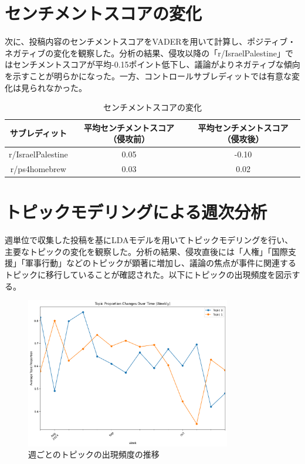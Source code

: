 \documentclass[11pt, a4j]{jreport}
\begin{document}
    \section{センチメントスコアの変化}
    次に、投稿内容のセンチメントスコアをVADERを用いて計算し、ポジティブ・ネガティブの変化を観察した。分析の結果、侵攻以降の「r/IsraelPalestine」ではセンチメントスコアが平均-0.15ポイント低下し、議論がよりネガティブな傾向を示すことが明らかになった。一方、コントロールサブレディットでは有意な変化は見られなかった。

    \begin{table}[H]
        \centering
        \begin{tabular}{|c|c|c|}
            \hline
            サブレディット & 平均センチメントスコア（侵攻前） & 平均センチメントスコア（侵攻後） \\
            \hline
            r/IsraelPalestine & 0.05 & -0.10 \\
            r/ps4homebrew & 0.03 & 0.02 \\
            \hline
        \end{tabular}
        \caption{センチメントスコアの変化}
    \end{table}

    \section{トピックモデリングによる週次分析}
    週単位で収集した投稿を基にLDAモデルを用いてトピックモデリングを行い、主要なトピックの変化を観察した。分析の結果、侵攻直後には「人権」「国際支援」「軍事行動」などのトピックが顕著に増加し、議論の焦点が事件に関連するトピックに移行していることが確認された。以下にトピックの出現頻度を図示する。

    \begin{figure}[H]
        \centering
        \includegraphics[width=0.8\textwidth]{topic_trends_plot.png}
        \caption{週ごとのトピックの出現頻度の推移}
    \end{figure}
\end{document}
